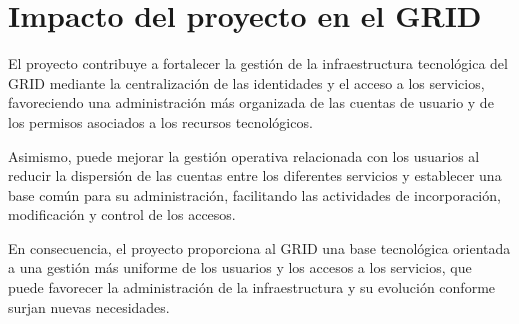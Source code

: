 \section{Impacto del proyecto en el \texorpdfstring{\ac{GRID}}{}}

El proyecto contribuye a fortalecer la gestión de la infraestructura tecnológica del \ac{GRID} mediante la centralización de las identidades y el acceso a los servicios, favoreciendo una administración más organizada de las cuentas de usuario y de los permisos asociados a los recursos tecnológicos.

Asimismo, puede mejorar la gestión operativa relacionada con los usuarios al reducir la dispersión de las cuentas entre los diferentes servicios y establecer una base común para su administración, facilitando las actividades de incorporación, modificación y control de los accesos.

En consecuencia, el proyecto proporciona al \ac{GRID} una base tecnológica orientada a una gestión más uniforme de los usuarios y los accesos a los servicios, que puede favorecer la administración de la infraestructura y su evolución conforme surjan nuevas necesidades.
